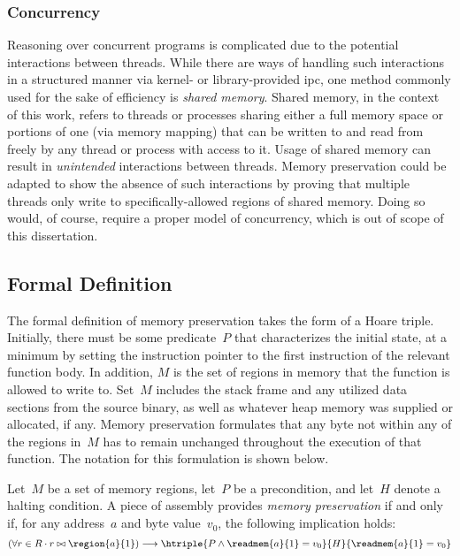 \subsubsection{Concurrency}
Reasoning over concurrent programs is complicated
due to the potential interactions between threads.
While there are ways of handling such interactions in a structured manner
via kernel- or library-provided \ac{ipc},
one method commonly used for the sake of efficiency is \emph{shared memory}.
Shared memory, in the context of this work,
refers to threads or processes sharing either a full memory space
or portions of one (via memory mapping)
that can be written to and read from freely by any thread or process with access to it.
Usage of shared memory can result in \emph{unintended} interactions between threads.
Memory preservation could be adapted to show the absence of such interactions
by proving that multiple threads only write
to specifically-allowed regions of shared memory.
Doing so would, of course, require a proper model of concurrency,
which is out of scope of this dissertation.

\subsection{Formal Definition}
The formal definition of memory preservation takes the form of a Hoare triple.%
%
Initially, there must be some predicate~$P$ that characterizes the initial state,
at a minimum by setting the instruction pointer
to the first instruction of the relevant function body.
In addition, $M$ is the set of regions in memory
that the function is allowed to write to.
Set~$M$ includes the stack frame and any utilized data sections from the source binary,
as well as whatever heap memory was supplied or allocated, if any.
Memory preservation formulates that any byte not within any of the regions in~$M$
has to remain unchanged throughout the execution of that function.
The notation for this formulation is shown below.
\begin{definition}\label{mem_pres_hoare}
  Let~$M$ be a set of memory regions, let~$P$ be a precondition,
  and let~$H$ denote a halting condition.
  A piece of assembly provides \emph{memory preservation} if and only if, for any address~$a$ and byte value~$v_0$, the following implication holds:
  \begin{equation}
  (\forall r\in R\cdot r\bowtie\region{a}{1})\longrightarrow\htriple{P\wedge \readmem{a}{1}=v_0}{H}{\readmem{a}{1}=v_0}
  \end{equation}
\end{definition}
\begin{example}
\end{example}

